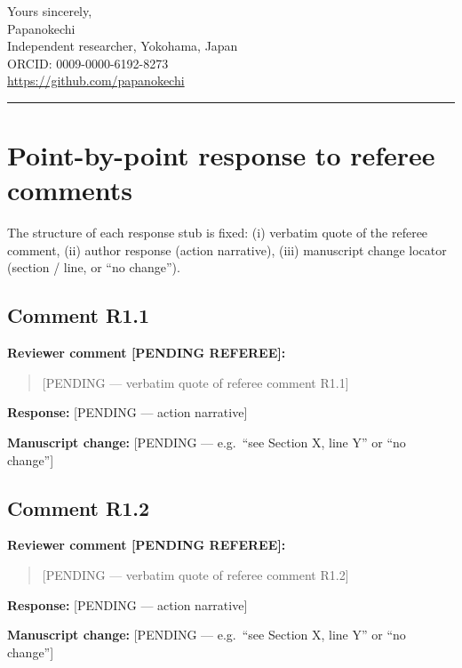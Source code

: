 \documentclass[11pt]{amsart}
\begin{document}
\medskip

\noindent
Yours sincerely,\\[0.6em]
Papanokechi\\
Independent researcher, Yokohama, Japan\\
ORCID: 0009-0000-6192-8273\\
\url{https://github.com/papanokechi}

\bigskip
\hrule
\bigskip

\section*{Point-by-point response to referee comments}

\noindent
The structure of each response stub is fixed: (i) verbatim quote of
the referee comment, (ii) author response (action narrative), (iii)
manuscript change locator (section / line, or ``no change'').

\bigskip

\subsection*{Comment R1.1}
\noindent\textbf{Reviewer comment [PENDING REFEREE]:}
\begin{quote}
[PENDING --- verbatim quote of referee comment R1.1]
\end{quote}

\noindent\textbf{Response:} [PENDING --- action narrative]

\noindent\textbf{Manuscript change:} [PENDING --- e.g.\ ``see Section X, line Y'' or ``no change'']

\bigskip

\subsection*{Comment R1.2}
\noindent\textbf{Reviewer comment [PENDING REFEREE]:}
\begin{quote}
[PENDING --- verbatim quote of referee comment R1.2]
\end{quote}

\noindent\textbf{Response:} [PENDING --- action narrative]

\noindent\textbf{Manuscript change:} [PENDING --- e.g.\ ``see Section X, line Y'' or ``no change'']

\bigskip
\end{document}
